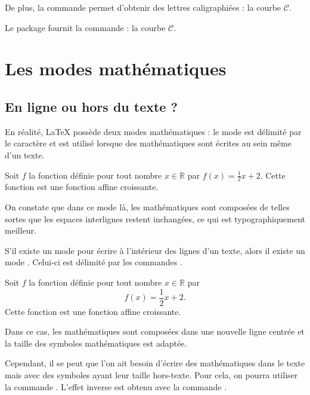 \documentclass[10pt,french,openright,twoside]{book}
\begin{document}
De plus, la commande  permet d'obtenir des lettres caligraphiées : la courbe $\mathcal C$.\par
Le package  fournit la commande  : la courbe $\mathscr C$.

\section{Les modes mathématiques}
\subsection{En ligne ou hors du texte ?}

En réalité, \LaTeX{} possède deux modes mathématiques : le mode  est délimité par le caractère \ordi{\$} et est utilisé lorsque des mathématiques sont écrites au sein même d'un texte.\bigskip

{\NewFont
\begin{SideBySideExample}
    Soit $f$ la fonction d\'efinie pour tout nombre
    $x \in \mathds R$ par $f(x) = \frac 12 x + 2$.
    Cette fonction est une fonction affine croissante.
\end{SideBySideExample}
}\bigskip

On constate que dans ce mode là, les mathématiques sont composées de telles sortes que les espaces interlignes restent inchangées, ce qui est typographiquement meilleur.\medskip

S'il existe un mode  pour écrire à l'intérieur des lignes d'un texte, alors il existe un mode . Celui-ci est délimité par les commandes \NomCom [ et \NomCom ].\bigskip

{\NewFont
\begin{SideBySideExample}
    Soit $f$ la fonction d\'efinie pour tout nombre
    $x \in \mathds R$ par \[f(x) = \frac 12 x + 2.\]
    Cette fonction est une fonction affine croissante.
\end{SideBySideExample}
}\bigskip

Dans ce cas, les mathématiques sont composées dans une nouvelle ligne centrée et la taille des symboles mathématiques est adaptée.

Cependant, il se peut que l'on ait besoin d'écrire des mathématiques dans le texte mais avec des symboles ayant leur taille hors-texte. Pour cela, on pourra utiliser la commande . L'effet inverse est obtenu avec la commande .\bigskip
\end{document}
